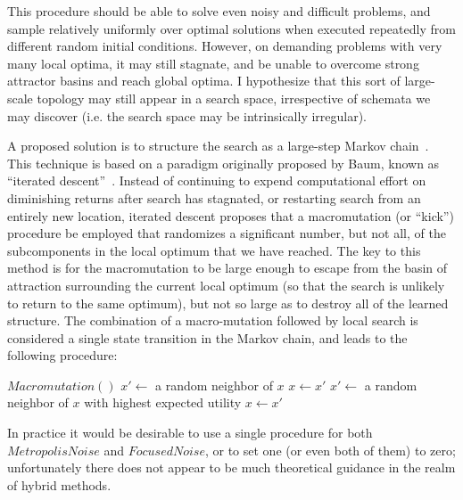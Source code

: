 \documentclass[letterpaper]{article}
\begin{document}
This procedure should be able to solve even noisy and difficult problems, and
sample relatively uniformly over optimal solutions when executed repeatedly
from different random initial conditions. However, on demanding problems with
very many local optima, it may still stagnate, and be unable to overcome strong
attractor basins and reach global optima. I hypothesize that this sort of
large-scale topology may still appear in a search space, irrespective of
schemata we may discover (i.e. the search space may be intrinsically
irregular). 

A proposed solution is to structure the search as a large-step Markov
chain~\cite{LSMC}. This technique is based on a paradigm originally proposed by
Baum, known as ``iterated descent''~\cite{BaumDescent}. Instead of continuing
to expend computational effort on diminishing returns after search has
stagnated, or restarting search from an entirely new location, iterated descent
proposes that a macromutation (or ``kick'') procedure be employed that
randomizes a significant number, but not all, of the subcomponents in the local
optimum that we have reached. The key to this method is for the macromutation
to be large enough to escape from the basin of attraction surrounding the
current local optimum (so that the search is unlikely to return to the same
optimum), but not so large as to destroy all of the learned structure. The
combination of a macro-mutation followed by local search is considered a single
state transition in the Markov chain, and leads to the following procedure:

\begin{algorithmic}
      \State $Macromutation()$
      \State $x' \leftarrow$ a random neighbor of $x$
        \State $x \leftarrow x'$
      \EndIf
    \Else
      \State $x' \leftarrow$ a random neighbor of $x$ with highest expected
      utility
        \State $x \leftarrow x'$
      \EndIf
    \EndIf
  \EndWhile
\EndProcedure
\end{algorithmic}

In practice it would be desirable to use a single procedure for both
$MetropolisNoise$ and $FocusedNoise$, or to set one (or even both of them) to
zero; unfortunately there does not appear to be much theoretical guidance in
the realm of hybrid methods. 
\end{document}
